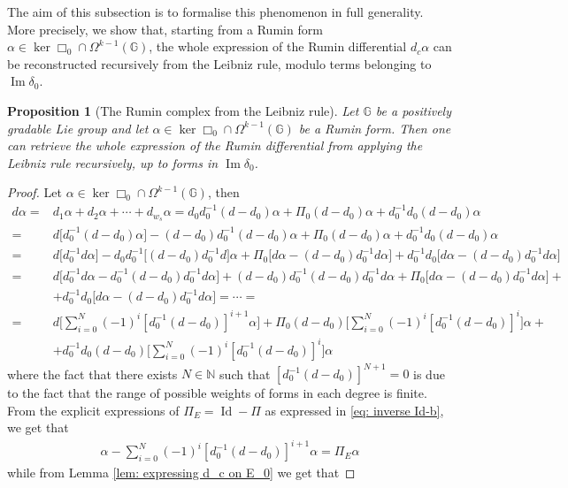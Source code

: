 \documentclass[dvipsnames]{amsart}
\newtheorem{proposition}[theorem]{Proposition}
\theoremstyle{definition}
\theoremstyle{definition}
\numberwithin{equation}{section}
\newcommand{\G}{\mathbb{G}}
\begin{document}
The aim of this subsection is to formalise this phenomenon in full generality. More precisely, we show that, starting from a Rumin form \(\alpha\in\ker\Box_0\cap\Omega^{k-1}(\G)\), the whole expression of the Rumin differential \(d_c\alpha\) can be reconstructed recursively from the Leibniz rule, modulo terms belonging to \(\operatorname{Im}\delta_0\).
\begin{proposition}[The Rumin complex from the Leibniz rule]\label{prop: d_c from Leibniz}
    Let $\G$ be a positively gradable Lie group and let $\alpha\in\ker\Box_0\cap\Omega^{k-1}(\G)$ be a Rumin form. Then one can retrieve the whole expression of the Rumin differential from applying the Leibniz rule recursively, up to forms in $\operatorname{Im}\delta_0$.
\end{proposition}
\begin{proof}
    Let $\alpha\in\ker\Box_0\cap\Omega^{k-1}(\G)$, then
    \begin{align*}
        d\alpha=&d_1\alpha+d_2\alpha+\cdots+d_{w_s}\alpha=d_0d_0^{-1}(d-d_0)\alpha+\Pi_0(d-d_0)\alpha+d_0^{-1}d_0(d-d_0)\alpha\\=&d\big[d_0^{-1}(d-d_0)\alpha\big]-(d-d_0)d_0^{-1}(d-d_0)\alpha+\Pi_0(d-d_0)\alpha+d_0^{-1}d_0(d-d_0)\alpha\\=&d\big[d_0^{-1}d\alpha\big]-d_0d_0^{-1}\big[(d-d_0)d_0^{-1}d\big]\alpha+\Pi_0\big[d\alpha-(d-d_0)d_0^{-1}d\alpha\big]+d_0^{-1}d_0\big[d\alpha-(d-d_0)d_0^{-1}d\alpha\big]\\=&d\big[d_0^{-1}d\alpha-d_0^{-1}(d-d_0)d_0^{-1}d\alpha\big]+(d-d_0)d_0^{-1}(d-d_0)d_0^{-1}d\alpha+\Pi_0\big[d\alpha-(d-d_0)d_0^{-1}d\alpha\big]+\\&+d_0^{-1}d_0\big[d\alpha-(d-d_0)d_0^{-1}d\alpha\big]=\cdots=\\=&d\big[\sum_{i=0}^N(-1)^i[d_0^{-1}(d-d_0)]^{i+1}\alpha\big]+\Pi_0(d-d_0)\big[\sum_{i=0}^N(-1)^i[d_0^{-1}(d-d_0)]^{i}\big]\alpha+\\&+d_0^{-1}d_0(d-d_0)\big[\sum_{i=0}^N(-1)^i[d_0^{-1}(d-d_0)]^{i}\big]\alpha
    \end{align*}
    where the fact that there exists $N\in\mathbb N$ such that $[d_0^{-1}(d-d_0)]^{N+1}=0$ is due to the fact that the range of possible weights of forms in each degree is finite. From the explicit expressions of $\Pi_E=\operatorname{Id}-\Pi$ as expressed in \eqref{eq: inverse Id-b}, we get that
    \begin{align*}
        \alpha-\sum_{i=0}^N(-1)^i[d_0^{-1}(d-d_0)]^{i+1}\alpha=\Pi_E\alpha
    \end{align*}
    while from Lemma \ref{lem: expressing d_c on E_0} we get that

\end{proof}
\end{document}
